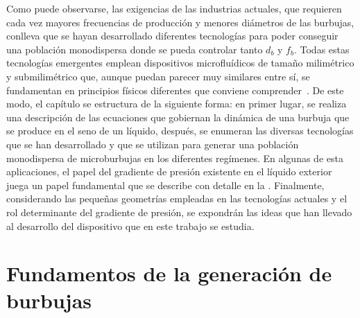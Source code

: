 Como puede observarse, las exigencias de las industrias actuales, que requieren cada vez mayores frecuencias de producción y menores diámetros de las burbujas, conlleva que se hayan desarrollado diferentes tecnologías para poder conseguir una población monodispersa donde se pueda controlar tanto $d_{b}$ y $f_{b}$. Todas estas tecnologías emergentes emplean dispositivos microfluídicos de tamaño milimétrico y submilimétrico que, aunque puedan parecer muy similares entre sí, se fundamentan en principios físicos diferentes que conviene comprender~\cite{Rodriguez-Rodriguez2015b}. De este modo, el capítulo se estructura de la siguiente forma: en primer lugar, se realiza una descripción de las ecuaciones que gobiernan la dinámica de una burbuja que se produce en el seno de un líquido, después, se enumeran las diversas tecnologías que se han desarrollado y que se utilizan para generar una población monodispersa de microburbujas en los diferentes regímenes. En algunas de esta aplicaciones, el papel del gradiente de presión existente en el líquido exterior juega un papel fundamental que se describe con detalle en la . Finalmente, considerando las pequeñas geometrías empleadas en las tecnologías actuales y el rol determinante del gradiente de presión, se expondrán las ideas que han llevado al desarrollo del dispositivo que en este trabajo se estudia. 

\section{Fundamentos de la generación de burbujas}

